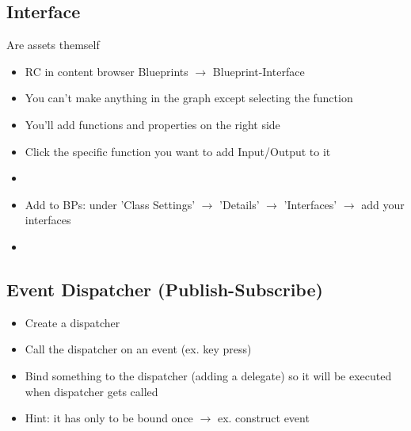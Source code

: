     \subsection{Interface}
        Are assets themself \\
        \begin{itemize}
            \item RC in content browser Blueprints $\rightarrow$ Blueprint-Interface
            \item You can't make anything in the graph except selecting the function
            \item You'll add functions and properties on the right side
            \item Click the specific function you want to add Input/Output to it
            \item 
            \item Add to BPs: under 'Class Settings' $\rightarrow$ 'Details' $\rightarrow$ 'Interfaces' $\rightarrow$ add your interfaces
            \item 
        \end{itemize}


    \subsection{Event Dispatcher (Publish-Subscribe)}
        \begin{itemize}
            \item Create a dispatcher
            \item Call the dispatcher on an event (ex. key press)
            \item Bind something to the dispatcher (adding a delegate) so it will be executed when dispatcher gets called
            \item Hint: it has only to be bound once $\rightarrow$ ex. construct event
        \end{itemize}

